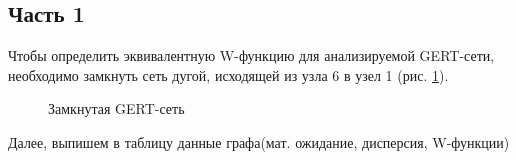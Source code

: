 \subsection{Часть 1}
Чтобы определить эквивалентную W-функцию для анализируемой GERT-сети, необходимо замкнуть сеть дугой, исходящей из узла 6 в узел 1 (рис. \ref{pic_1}).
\begin{figure}[H]
  \centering
  \caption{Замкнутая GERT-сеть}
  \label{pic_1}
\end{figure}
Далее, выпишем в таблицу данные графа(мат. ожидание, дисперсия, W-функции)

